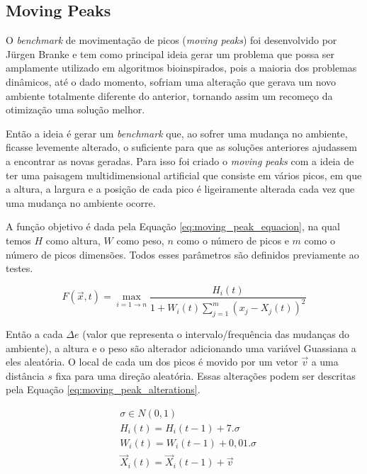 \subsection{Moving Peaks}
\label{sec:moving_peaks}

O \textit{benchmark} de movimentação de picos (\textit{moving peaks}) foi desenvolvido por Jürgen Branke \cite{moving_peak_1999} e tem como principal ideia gerar um problema que possa ser amplamente utilizado em algoritmos bioinspirados, pois a maioria dos problemas dinâmicos, até o dado momento, sofriam uma alteração que gerava um novo ambiente totalmente diferente do anterior, tornando assim um recomeço da otimização uma solução melhor.

Então a ideia é gerar um \textit{benchmark} que, ao sofrer uma mudança no ambiente, ficasse levemente alterado, o suficiente para que as soluções anteriores ajudassem a encontrar as novas geradas. Para isso foi criado o \textit{moving peaks} com a ideia de ter uma paisagem multidimensional artificial que consiste em vários picos, em que a altura, a largura e a posição de cada pico é ligeiramente alterada cada vez que uma mudança no ambiente ocorre.

A função objetivo é dada pela Equação \ref{eq:moving_peak_equacion}, na qual temos $ H $ como altura, $ W $ como peso, $ n $ como o número de picos e $ m $ como o número de picos dimensões. Todos esses parâmetros são definidos previamente ao testes.

\begin{equation}
\label{eq:moving_peak_equacion}
F(\vec{x},t) = \max_{i = 1 \to n} \frac {H_i(t)}{1 + W_i(t)\sum_{j=1}^{m} (x_j - X_j(t))^2}
\end{equation}

Então a cada $\Delta e$ (valor que representa o intervalo/frequência das mudanças do ambiente), a altura e o peso são alterador adicionando uma variável Guassiana a eles aleatória. O local de cada um dos picos é movido por um vetor $\vec{v}$ a uma distância $ s $ fixa para uma direção aleatória. Essas alterações podem ser descritas pela Equação \ref{eq:moving_peak_alterations}.

\begin{equation}
\label{eq:moving_peak_alterations}
\begin{split}
& \sigma \in N(0,1) \\
& H_i(t) = H_i(t-1) + 7.\sigma \\
& W_i(t) = W_i(t-1) + 0,01.\sigma \\
& \vec{X}_i(t) = \vec{X}_i(t-1) + \vec{v}
\end{split}
\end{equation}

